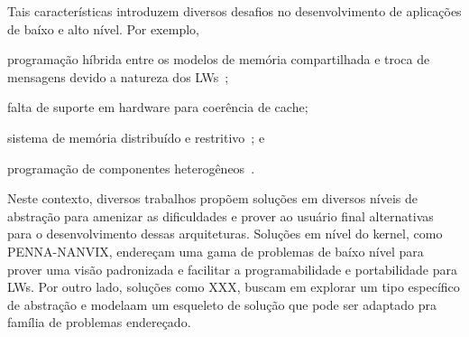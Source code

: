 	Tais características introduzem diversos desafios no desenvolvimento de
	aplicações de baíxo e alto nível. Por exemplo, 
	\begin{enumerate*}[label=(\roman*)]
		\item programação híbrida entre os modelos de memória compartilhada
			e troca de mensagens devido a natureza dos LWs~\cite{kelly2013};

		\item falta de suporte em hardware para coerência de
			cache\cite{francesquini2015};

		\item sistema de memória distribuído e restritivo~\cite{Castro2016}; e 

		\item programação de componentes heterogêneos~\cite{Barbalace2015}.
	\end{enumerate*}
	Neste contexto, diversos trabalhos propõem soluções em diversos níveis de
	abstração para amenizar as dificuldades e prover ao usuário final
	alternativas para o desenvolvimento dessas arquiteturas.
	Soluções em nível do kernel, como PENNA-NANVIX, endereçam uma gama de
	problemas de baíxo nível para prover uma visão padronizada e facilitar
	a programabilidade e portabilidade para LWs.
	Por outro lado, soluções como XXX, buscam em explorar um tipo específico de
	abstração e modelaam um esqueleto de solução que pode ser adaptado pra
	família de problemas endereçado.


